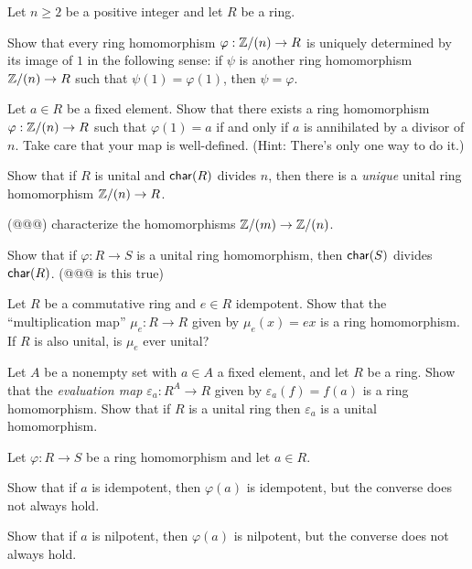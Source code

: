 \begin{exercise} \label{exerc:homs-from-zzn}
Let \(n \geq 2\) be a positive integer and let \(R\) be a ring.
\begin{proplist}
\item Show that every ring homomorphism \(\varphi : \mathbb{Z}/(n) \rightarrow R\) is uniquely determined by its image of \(1\) in the following sense: if \(\psi\) is another ring homomorphism \(\mathbb{Z}/(n) \rightarrow R\) such that \(\psi(1) = \varphi(1)\), then \(\psi = \varphi\).
\item Let \(a \in R\) be a fixed element.
Show that there exists a ring homomorphism \(\varphi : \mathbb{Z}/(n) \rightarrow R\) such that \(\varphi(1) = a\) if and only if \(a\) is annihilated by a divisor of \(n\).
Take care that your map is well-defined.
(Hint: There's only one way to do it.)
\item Show that if \(R\) is unital and \(\mathsf{char}(R)\) divides \(n\), then there is a \emph{unique} unital ring homomorphism \(\mathbb{Z}/(n) \rightarrow R\).
\end{proplist}
\end{exercise}


\begin{exercise}
(@@@) characterize the homomorphisms \(\mathbb{Z}/(m) \rightarrow \mathbb{Z}/(n)\).
\end{exercise}


\begin{exercise}
Show that if \(\varphi : R \rightarrow S\) is a unital ring homomorphism, then \(\mathsf{char}(S)\) divides \(\mathsf{char}(R)\). (@@@ is this true)
\end{exercise}


\begin{exercise}
Let \(R\) be a commutative ring and \(e \in R\) idempotent.
Show that the ``multiplication map'' \(\mu_e : R \rightarrow R\) given by \(\mu_e(x) = ex\) is a ring homomorphism.
If \(R\) is also unital, is \(\mu_e\) ever unital?
\end{exercise}


\begin{exercise}
Let \(A\) be a nonempty set with \(a \in A\) a fixed element, and let \(R\) be a ring.
Show that the \emph{evaluation map} \(\varepsilon_a : R^A \rightarrow R\) given by \(\varepsilon_a(f) = f(a)\) is a ring homomorphism.
Show that if \(R\) is a unital ring then \(\varepsilon_a\) is a unital homomorphism.
\end{exercise}


\begin{exercise}
Let \(\varphi : R \rightarrow S\) be a ring homomorphism and let \(a \in R\).
\begin{proplist}
\item Show that if \(a\) is idempotent, then \(\varphi(a)\) is idempotent, but the converse does not always hold.
\item Show that if \(a\) is nilpotent, then \(\varphi(a)\) is nilpotent, but the converse does not always hold.
\end{proplist}
\end{exercise}


